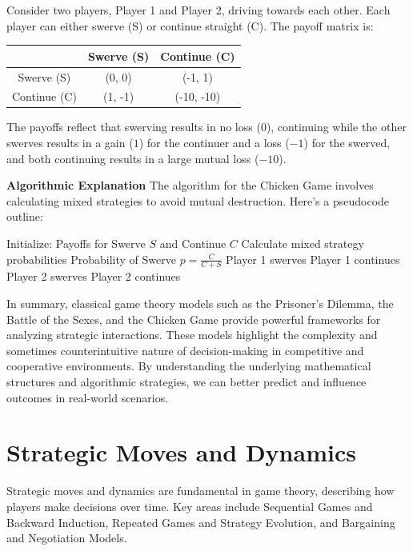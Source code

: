 \documentclass[12pt]{book} %
\begin{document}
Consider two players, Player 1 and Player 2, driving towards each other. Each player can either swerve (S) or continue straight (C). The payoff matrix is:

\begin{center}
\begin{tabular}{c|c|c}
 & Swerve (S) & Continue (C) \\ \hline
Swerve (S) & (0, 0) & (-1, 1) \\ \hline
Continue (C) & (1, -1) & (-10, -10) \\
\end{tabular}
\end{center}

The payoffs reflect that swerving results in no loss ($0$), continuing while the other swerves results in a gain ($1$) for the continuer and a loss ($-1$) for the swerved, and both continuing results in a large mutual loss ($-10$).

\textbf{Algorithmic Explanation}
The algorithm for the Chicken Game involves calculating mixed strategies to avoid mutual destruction. Here's a pseudocode outline:
\FloatBarrier
\begin{algorithm}
\caption{Chicken Game Strategy}
\begin{algorithmic}[1]
\State Initialize: Payoffs for Swerve $S$ and Continue $C$
\State Calculate mixed strategy probabilities
\State Probability of Swerve $p = \frac{C}{C+S}$
    \State Player 1 swerves
\Else
    \State Player 1 continues
\EndIf
{}
    \State Player 2 swerves
\Else
    \State Player 2 continues
\EndIf
\end{algorithmic}
\end{algorithm}
\FloatBarrier

In summary, classical game theory models such as the Prisoner's Dilemma, the Battle of the Sexes, and the Chicken Game provide powerful frameworks for analyzing strategic interactions. These models highlight the complexity and sometimes counterintuitive nature of decision-making in competitive and cooperative environments. By understanding the underlying mathematical structures and algorithmic strategies, we can better predict and influence outcomes in real-world scenarios.


\section{Strategic Moves and Dynamics}

Strategic moves and dynamics are fundamental in game theory, describing how players make decisions over time. Key areas include Sequential Games and Backward Induction, Repeated Games and Strategy Evolution, and Bargaining and Negotiation Models.
\end{document}
